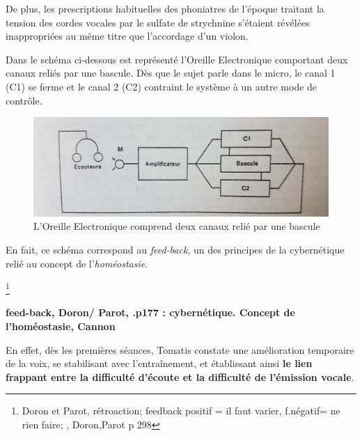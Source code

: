  De plus, les prescriptions habituelles des phoniatres de
l'époque traitant la tension des cordes vocales par le sulfate de
strychnine s'étaient révélées inappropriées au même titre que
l'accordage d'un violon.

Dans le schéma ci-dessous est représenté l'Oreille Electronique
comportant deux canaux reliés par une bascule. Dès que le sujet parle
dans le micro, le canal 1 (C1) se ferme et  le canal 2 (C2) contraint le
système à un autre mode de contrôle.



\begin{figure}
	\centering
	\includegraphics[width=0.7\linewidth]{images/oreilleelectro.jpg}
	\caption[ oreilleelectro]{L'Oreille Electronique
          comprend deux canaux relié par une bascule}
       
	\label{oreilleelectro}
      \end{figure}
      
En fait, ce schéma correspond au\textit{ feed-back}, un des principes
de la cybernétique relié au concept de l'\textit{homéostasie}.


\footnote{Doron et Parot, rétroaction;
  feedback positif = il faut varier, f.négatif= ne rien faire; 
, Doron,Parot p 298}

      \textbf{feed-back, Doron/ Parot, .p177 : cybernétique. Concept de l'homéostasie, Cannon}

 En effet, dès les premières
séances, Tomatis constate une amélioration temporaire de la voix, se
stabilisant avec l'entraînement, et établissant ainsi
\textbf{le lien frappant entre la difficulté d'écoute et la
  difficulté de
  l'émission vocale}.


